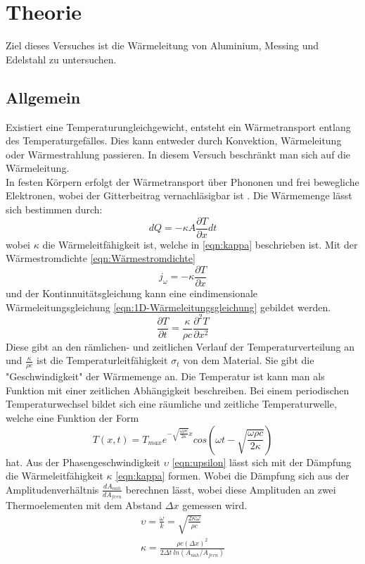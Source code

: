 \section{Theorie}
\label{sec:Theorie}
 
Ziel dieses Versuches ist die Wärmeleitung von Aluminium, Messing und Edelstahl zu untersuchen.

\subsection{Allgemein}

Existiert eine Temperaturungleichgewicht, entsteht ein Wärmetransport entlang des Temperaturgefälles. 
Dies kann entweder durch Konvektion, Wärmeleitung oder Wärmestrahlung passieren.
In diesem Versuch beschränkt man sich auf die Wärmeleitung.\\
In festen Körpern erfolgt der Wärmetransport über Phononen und frei bewegliche Elektronen, wobei der Gitterbeitrag vernachläsigbar ist \cite[1]{V204}.
Die Wärmemenge lässt sich bestimmen durch:
\begin{equation}
    dQ = -\kappa A \frac{\partial T}{\partial x} dt
    \label{eqn:Wärmemenge}
\end{equation}
wobei $\kappa$ die Wärmeleitfähigkeit ist, welche in \autoref{eqn:kappa} beschrieben ist.
Mit der Wärmestromdichte \autoref{eqn:Wärmestromdichte}
\begin{equation}
    j_{\omega} = -\kappa\frac{\partial T}{\partial x}
    \label{eqn:Wärmestromdichte}
\end{equation}
und der Kontinnuitätsgleichung kann eine eindimensionale Wärmeleitungsgleichung \autoref{eqn:1D-Wärmeleitungsgleichung} gebildet werden.
\begin{equation}
    \frac{\partial T}{\partial t} = \frac{\kappa}{\rho c} \frac{\partial ^2 T}{\partial x^2}
    \label{eqn:1D-Wärmeleitungsgleichung}
\end{equation}
Diese gibt an den rämlichen- und zeitlichen Verlauf der Temperaturverteilung an und $\frac{\kappa}{\rho c}$ ist die Temperaturleitfähigkeit $\sigma_t$ von dem Material.
Sie gibt die "Geschwindigkeit" der Wärmemenge an.
Die Temperatur ist kann man als Funktion mit einer zeitlichen Abhängigkeit beschreiben.
Bei einem periodischen Temperaturwechsel bildet sich eine räumliche und zeitliche Temperaturwelle, welche eine Funktion der Form
\begin{equation}
   T(x,t) = T_{max} e^{-\sqrt{\frac{\omega \rho c}{2 \kappa}}x} cos(\omega t - \sqrt{\frac{\omega \rho c}{2 \kappa}})
   \label{eqn:periTempWel}
\end{equation} 
hat.
Aus der Phasengeschwindigkeit $\upsilon$ \autoref{eqn:upsilon} lässt sich mit der Dämpfung die Wärmeleitfähigkeit $\kappa$ \autoref{eqn:kappa} formen. 
Wobei die Dämpfung sich aus der Amplitudenverhältnis $\frac{dA_{nah}}{dA_{fern}}$ berechnen lässt, wobei diese Amplituden an zwei Thermoelementen mit dem Abstand $\Delta x$ gemessen wird.
\begin{align}
    \upsilon = \frac{\omega}{k} = \sqrt{\frac{2\kappa \omega}{\rho c}}
    \label{eqn:upsilon}\\
    \kappa =\frac{\rho c (\Delta x)^2}{2\Delta t \: ln(A_{nah}/A_{fern})}\label{eqn:kappa}
\end{align}